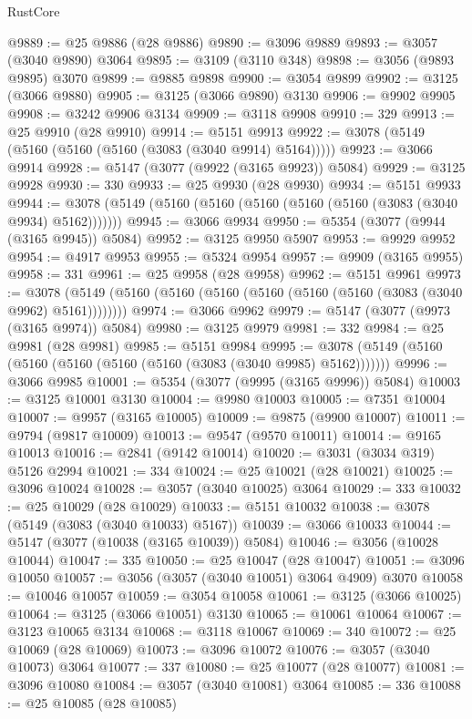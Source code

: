 \begin{lexlean}{RustCore}
\begin{coremodule}
@9889 := @25 @9886 (@28 @9886)
@9890 := @3096 @9889
@9893 := @3057 (@3040 @9890) @3064
@9895 := @3109 (@3110 @348)
@9898 := @3056 (@9893 @9895) @3070
@9899 := @9885 @9898
@9900 := @3054 @9899
@9902 := @3125 (@3066 @9880)
@9905 := @3125 (@3066 @9890) @3130
@9906 := @9902 @9905
@9908 := @3242 @9906 @3134
@9909 := @3118 @9908
@9910 := 329
@9913 := @25 @9910 (@28 @9910)
@9914 := @5151 @9913
@9922 := @3078 (@5149 (@5160 (@5160 (@5160 (@3083 (@3040 @9914) @5164)))))
@9923 := @3066 @9914
@9928 := @5147 (@3077 (@9922 (@3165 @9923)) @5084)
@9929 := @3125 @9928
@9930 := 330
@9933 := @25 @9930 (@28 @9930)
@9934 := @5151 @9933
@9944 := @3078 (@5149 (@5160 (@5160 (@5160 (@5160 (@5160 (@3083 (@3040 @9934) @5162)))))))
@9945 := @3066 @9934
@9950 := @5354 (@3077 (@9944 (@3165 @9945)) @5084)
@9952 := @3125 @9950 @5907
@9953 := @9929 @9952
@9954 := @4917 @9953
@9955 := @5324 @9954
@9957 := @9909 (@3165 @9955)
@9958 := 331
@9961 := @25 @9958 (@28 @9958)
@9962 := @5151 @9961
@9973 := @3078 (@5149 (@5160 (@5160 (@5160 (@5160 (@5160 (@5160 (@3083 (@3040 @9962) @5161))))))))
@9974 := @3066 @9962
@9979 := @5147 (@3077 (@9973 (@3165 @9974)) @5084)
@9980 := @3125 @9979
@9981 := 332
@9984 := @25 @9981 (@28 @9981)
@9985 := @5151 @9984
@9995 := @3078 (@5149 (@5160 (@5160 (@5160 (@5160 (@5160 (@3083 (@3040 @9985) @5162)))))))
@9996 := @3066 @9985
@10001 := @5354 (@3077 (@9995 (@3165 @9996)) @5084)
@10003 := @3125 @10001 @3130
@10004 := @9980 @10003
@10005 := @7351 @10004
@10007 := @9957 (@3165 @10005)
@10009 := @9875 (@9900 @10007)
@10011 := @9794 (@9817 @10009)
@10013 := @9547 (@9570 @10011)
@10014 := @9165 @10013
@10016 := @2841 (@9142 @10014)
@10020 := @3031 (@3034 @319) @5126 @2994
@10021 := 334
@10024 := @25 @10021 (@28 @10021)
@10025 := @3096 @10024
@10028 := @3057 (@3040 @10025) @3064
@10029 := 333
@10032 := @25 @10029 (@28 @10029)
@10033 := @5151 @10032
@10038 := @3078 (@5149 (@3083 (@3040 @10033) @5167))
@10039 := @3066 @10033
@10044 := @5147 (@3077 (@10038 (@3165 @10039)) @5084)
@10046 := @3056 (@10028 @10044)
@10047 := 335
@10050 := @25 @10047 (@28 @10047)
@10051 := @3096 @10050
@10057 := @3056 (@3057 (@3040 @10051) @3064 @4909) @3070
@10058 := @10046 @10057
@10059 := @3054 @10058
@10061 := @3125 (@3066 @10025)
@10064 := @3125 (@3066 @10051) @3130
@10065 := @10061 @10064
@10067 := @3123 @10065 @3134
@10068 := @3118 @10067
@10069 := 340
@10072 := @25 @10069 (@28 @10069)
@10073 := @3096 @10072
@10076 := @3057 (@3040 @10073) @3064
@10077 := 337
@10080 := @25 @10077 (@28 @10077)
@10081 := @3096 @10080
@10084 := @3057 (@3040 @10081) @3064
@10085 := 336
@10088 := @25 @10085 (@28 @10085)

\end{coremodule}
\end{lexlean}
